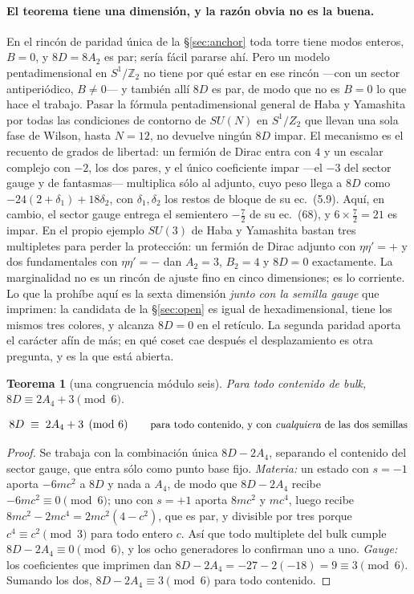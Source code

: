 \documentclass[11pt,a4paper]{article}
\newtheorem{theorem}{Teorema}
\newcommand{\ZZ}{\mathbb{Z}}
\newcommand{\su}[1]{SU(#1)}
\newenvironment{keyeq}
  {\begin{center}\setlength{\fboxsep}{9pt}\setlength{\fboxrule}{0.8pt}%
   \begin{lrbox}{\keyeqbox}\begin{minipage}{0.88\textwidth}}
  {\end{minipage}\end{lrbox}%
   \fcolorbox{hdrblue!55}{hdrblue!6}{\usebox{\keyeqbox}}\end{center}}
\begin{document}
\paragraph{El teorema tiene una dimensión, y la razón obvia no es la buena.} En el rincón de paridad
única de la \S\ref{sec:anchor} toda torre tiene modos enteros, $B=0$, y $8D=8A_2$ es par; sería
fácil pararse ahí. Pero un modelo pentadimensional en $S^1/\ZZ_2$ no tiene por qué estar en ese
rincón ---con un sector antiperiódico, $B\neq0$--- y también allí $8D$ es par, de modo que no es
$B=0$ lo que hace el trabajo. Pasar la fórmula pentadimensional general de Haba y Yamashita
\cite{HY04} por todas las condiciones de contorno de $\su{N}$ en $S^1/Z_2$ que llevan una sola fase
de Wilson, hasta $N=12$, no devuelve ningún $8D$ impar. El mecanismo es el recuento de grados de
libertad: un fermión de Dirac entra con $4$ y un escalar complejo con $-2$, los dos pares, y el
único coeficiente impar ---el $-3$ del sector gauge y de fantasmas--- multiplica sólo al adjunto,
cuyo peso llega a $8D$ como $-24(2+\delta_1)+18\delta_2$, con $\delta_1,\delta_2$ los restos de
bloque de su ec.~(5.9). Aquí, en cambio, el sector gauge entrega el semientero $-\tfrac72$ de su
ec.~(68), y $6\times\tfrac72=21$ es impar. En el propio ejemplo $\su3$ de Haba y Yamashita bastan
tres multipletes para perder la protección: un fermión de Dirac adjunto con $\eta\eta'=+$ y dos
fundamentales con $\eta\eta'=-$ dan $A_2=3$, $B_2=4$ y $8D=0$ exactamente. La marginalidad no es un
rincón de ajuste fino en cinco dimensiones; es lo corriente. Lo que la prohíbe aquí es la sexta
dimensión \emph{junto con la semilla gauge} que \cite{KM25} imprimen: la candidata de la
\S\ref{sec:open} es igual de hexadimensional, tiene los mismos tres colores, y alcanza $8D=0$ en el
retículo. La segunda paridad aporta el carácter afín de más; en qué coset cae después el
desplazamiento es otra
pregunta, y es la que está abierta.

\begin{theorem}[una congruencia módulo seis]\label{thm:mod6}
Para todo contenido de bulk, $8D\equiv 2A_4+3 \pmod 6$.
\end{theorem}
\begin{keyeq}
\begin{equation}\label{eq:mod6law}
  8D\;\equiv\;2A_4+3 \pmod 6\qquad
  \text{\small para todo contenido, y con \emph{cualquiera} de las dos semillas}
\end{equation}
\end{keyeq}
\begin{proof}
Se trabaja con la combinación única $8D-2A_4$, separando el contenido del sector gauge, que entra
sólo como punto base fijo. \emph{Materia:} un estado con $s=-1$ aporta $-6mc^2$ a $8D$ y nada a
$A_4$, de modo que $8D-2A_4$ recibe $-6mc^2\equiv0\pmod6$; uno con $s=+1$ aporta $8mc^2$ y $mc^4$,
luego recibe $8mc^2-2mc^4=2mc^2(4-c^2)$, que es par, y divisible por tres porque $c^4\equiv
c^2\pmod3$ para todo entero $c$. Así que todo multiplete del bulk cumple $8D-2A_4\equiv0\pmod 6$, y
los ocho generadores lo confirman uno a uno. \emph{Gauge:} los coeficientes que \cite{KM25}
imprimen dan $8D-2A_4=-27-2(-18)=9\equiv3\pmod6$. Sumando los dos, $8D-2A_4\equiv3\pmod 6$ para
todo contenido.
\end{proof}
\end{document}
